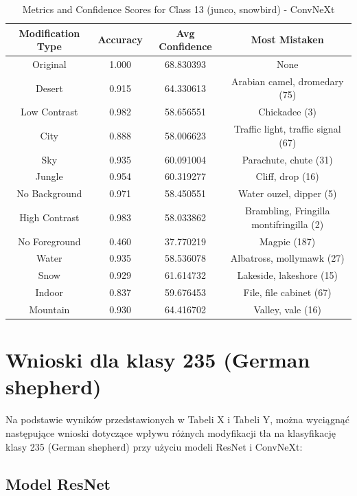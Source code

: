 \begin{table}
	\centering
	\begin{tabular}{|c|c|c|c|}
		\hline
		\textbf{Modification Type} & \textbf{Accuracy} & \textbf{Avg Confidence} & \textbf{Most Mistaken} \\
		\hline
		Original & 1.000 & 68.830393 & None \\
		\hline
		Desert & 0.915 & 64.330613 & Arabian camel, dromedary (75) \\
		\hline
		Low Contrast & 0.982 & 58.656551 & Chickadee (3) \\
		\hline
		City & 0.888 & 58.006623 & Traffic light, traffic signal (67) \\
		\hline
		Sky & 0.935 & 60.091004 & Parachute, chute (31) \\
		\hline
		Jungle & 0.954 & 60.319277 & Cliff, drop (16) \\
		\hline
		No Background & 0.971 & 58.450551 & Water ouzel, dipper (5) \\
		\hline
		High Contrast & 0.983 & 58.033862 & Brambling, Fringilla montifringilla (2) \\
		\hline
		No Foreground & 0.460 & 37.770219 & Magpie (187) \\
		\hline
		Water & 0.935 & 58.536078 & Albatross, mollymawk (27) \\
		\hline
		Snow & 0.929 & 61.614732 & Lakeside, lakeshore (15) \\
		\hline
		Indoor & 0.837 & 59.676453 & File, file cabinet (67) \\
		\hline
		Mountain & 0.930 & 64.416702 & Valley, vale (16) \\
		\hline
	\end{tabular}
	\caption{Metrics and Confidence Scores for Class 13 (junco, snowbird) - ConvNeXt}
	\label{tab:metrics_confidence_class_13_convnext}
\end{table}

\section*{Wnioski dla klasy 235 (German shepherd)}

Na podstawie wyników przedstawionych w Tabeli X i Tabeli Y, można wyciągnąć następujące wnioski dotyczące wpływu różnych modyfikacji tła na klasyfikację klasy 235 (German shepherd) przy użyciu modeli ResNet i ConvNeXt:

\subsection*{Model ResNet}


